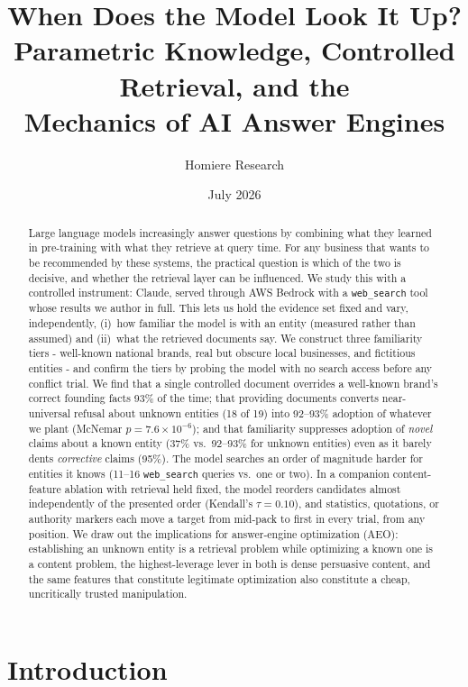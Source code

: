 \documentclass[11pt]{article}
\title{\bfseries When Does the Model Look It Up?\\
Parametric Knowledge, Controlled Retrieval, and the\\ Mechanics of AI Answer Engines}
\author[ ]{Homiere Research}
\affil[ ]{\normalsize \texttt{hello@homiere.com}}
\date{July 2026}
\begin{document}
\maketitle

\begin{abstract}
\noindent
Large language models increasingly answer questions by combining what they learned in
pre-training with what they retrieve at query time. For any business that wants to be
recommended by these systems, the practical question is which of the two is decisive, and
whether the retrieval layer can be influenced. We study this with a controlled instrument:
Claude, served through AWS Bedrock with a \texttt{web\_search} tool whose results we author in
full. This lets us hold the evidence set fixed and vary, independently, (i)~how familiar the
model is with an entity (measured rather than assumed) and (ii)~what the retrieved documents
say. We construct three familiarity tiers - well-known national brands, real but obscure local
businesses, and fictitious entities - and confirm the tiers by probing the model with no search
access before any conflict trial. We find that a single controlled document overrides a
well-known brand's correct founding facts 93\% of the time; that providing documents converts
near-universal refusal about unknown entities (18 of 19) into 92--93\% adoption of whatever we
plant (McNemar $p = 7.6\times10^{-6}$); and that familiarity suppresses adoption of \emph{novel}
claims about a known entity (37\% vs.\ 92--93\% for unknown entities) even as it barely dents
\emph{corrective} claims (95\%). The model searches an order of magnitude harder for entities it
knows (11--16 \texttt{web\_search} queries vs.\ one or two). In a companion content-feature ablation
with retrieval held fixed, the model reorders candidates almost independently of the presented order
(Kendall's $\tau = 0.10$), and statistics, quotations, or authority markers each move a target from
mid-pack to first in every trial, from any position. We draw out the implications for
answer-engine optimization (AEO): establishing an unknown entity is a retrieval problem while
optimizing a known one is a content problem, the highest-leverage lever in both is dense
persuasive content, and the same features that constitute legitimate optimization also constitute
a cheap, uncritically trusted manipulation.
\end{abstract}

\section{Introduction}
\end{document}
